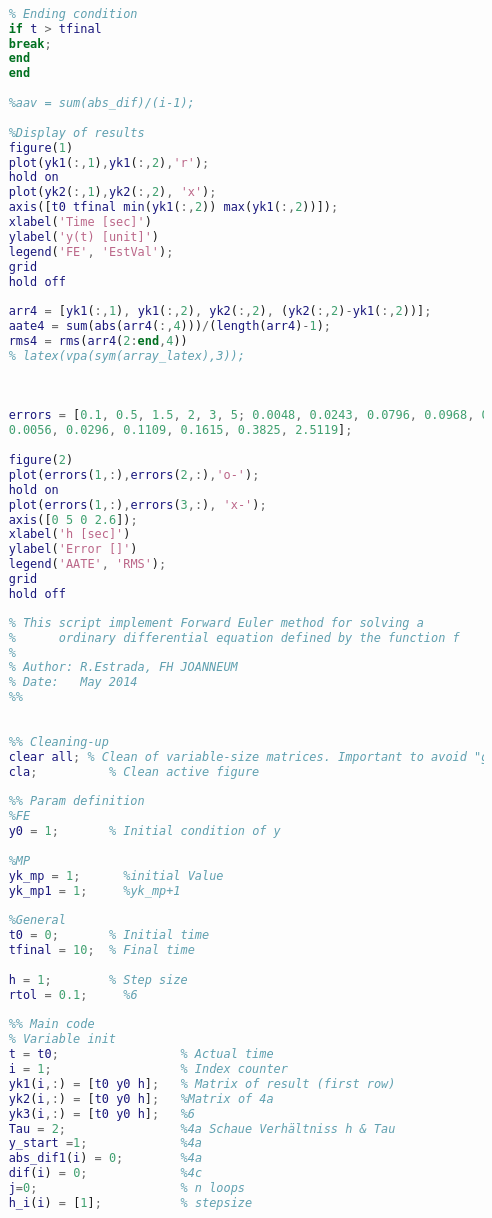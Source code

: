 \begin{appendices}
\begin{lstlisting}[caption={$test\_ode1$}, language=matlab, backgroundcolor = \color{lgray}, label={lst:ode1}]
	
	
	% Ending condition
	if t > tfinal
	break;
	end    
	end
	
	%aav = sum(abs_dif)/(i-1);
	
	%Display of results
	figure(1)
	plot(yk1(:,1),yk1(:,2),'r');
	hold on
	plot(yk2(:,1),yk2(:,2), 'x');
	axis([t0 tfinal min(yk1(:,2)) max(yk1(:,2))]);
	xlabel('Time [sec]')
	ylabel('y(t) [unit]')
	legend('FE', 'EstVal');
	grid
	hold off
	
	arr4 = [yk1(:,1), yk1(:,2), yk2(:,2), (yk2(:,2)-yk1(:,2))];
	aate4 = sum(abs(arr4(:,4)))/(length(arr4)-1);
	rms4 = rms(arr4(2:end,4))
	% latex(vpa(sym(array_latex),3));
	
	
	
	errors = [0.1, 0.5, 1.5, 2, 3, 5; 0.0048, 0.0243, 0.0796, 0.0968, 0.2799, 2.4003;...
	0.0056, 0.0296, 0.1109, 0.1615, 0.3825, 2.5119];
	
	figure(2)
	plot(errors(1,:),errors(2,:),'o-');
	hold on
	plot(errors(1,:),errors(3,:), 'x-');
	axis([0 5 0 2.6]);
	xlabel('h [sec]')
	ylabel('Error []')
	legend('AATE', 'RMS');
	grid
	hold off
\end{lstlisting}

\newpage
\begin{lstlisting}[caption={$test\_ode1$}, language=matlab, backgroundcolor = \color{lgray}, label={lst:ode12}]
	%%
	% This script implement Forward Euler method for solving a 
	%      ordinary differential equation defined by the function f
	%
	% Author: R.Estrada, FH JOANNEUM
	% Date:   May 2014
	%%
	
	
	%% Cleaning-up
	clear all; % Clean of variable-size matrices. Important to avoid "ghost" values
	cla;          % Clean active figure  
	
	%% Param definition
	%FE
	y0 = 1;       % Initial condition of y
	
	%MP
	yk_mp = 1;      %initial Value
	yk_mp1 = 1;     %yk_mp+1
	
	%General
	t0 = 0;       % Initial time  
	tfinal = 10;  % Final time
	
	h = 1;        % Step size
	rtol = 0.1;     %6
	
	%% Main code
	% Variable init
	t = t0;                 % Actual time 
	i = 1;                  % Index counter 
	yk1(i,:) = [t0 y0 h];   % Matrix of result (first row)
	yk2(i,:) = [t0 y0 h];   %Matrix of 4a
	yk3(i,:) = [t0 y0 h];   %6
	Tau = 2;                %4a Schaue Verhältniss h & Tau
	y_start =1;             %4a 
	abs_dif1(i) = 0;        %4a
	dif(i) = 0;             %4c
	j=0;                    % n loops
	h_i(i) = [1];           % stepsize
	

\end{lstlisting}
\end{appendices}
